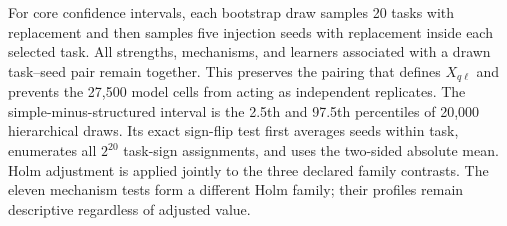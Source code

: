 \documentclass[sigconf,review]{acmart}
\begin{document}
For core confidence intervals, each bootstrap draw samples 20 tasks with
replacement and then samples five injection seeds with replacement inside each
selected task. All strengths, mechanisms, and learners associated with a drawn
task--seed pair remain together. This preserves the pairing that defines
$X_{q\ell}$ and prevents the 27,500 model cells from acting as independent
replicates. The simple-minus-structured interval is the 2.5th and 97.5th
percentiles of 20,000 hierarchical draws. Its exact sign-flip test first
averages seeds within task, enumerates all $2^{20}$ task-sign assignments, and
uses the two-sided absolute mean. Holm adjustment is applied jointly to the
three declared family contrasts. The eleven mechanism tests form a different
Holm family; their profiles remain descriptive regardless of adjusted value.
\end{document}
